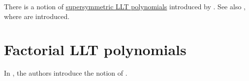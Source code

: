 There is a notion of \hyperref[supersymmetricLLTPolynomial]{supersymmetric LLT
polynomials} introduced by .
See also \cite{BrubakerBuciumasBumpGustafsson2020}, where
\label{metaplecticSymmetricFunction}
are introduced.


\section[lltFactorial]{Factorial LLT polynomials}

In \cite{AggarwalBorodinWheeler2023}, the authors introduce the notion of
\label{factorialLLTPolynomial}.
